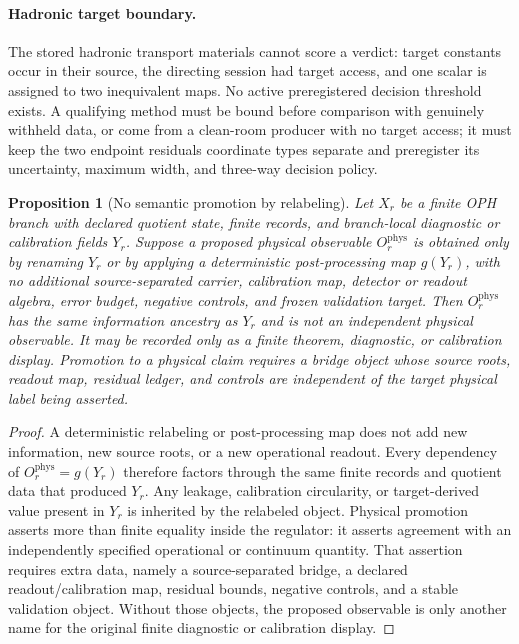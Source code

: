 \documentclass[11pt]{article}
\newtheorem{proposition}[theorem]{Proposition}
\begin{document}
\paragraph{Hadronic target boundary.}
The stored hadronic transport materials cannot score a verdict: target
constants occur in their source, the directing session had target access, and
one scalar is assigned to two inequivalent maps. No active preregistered
decision threshold exists. A qualifying method must be bound before comparison
with genuinely withheld data, or come from a clean-room producer with no target
access; it must keep the two endpoint residuals coordinate types separate and preregister its
uncertainty, maximum width, and three-way decision policy.

\begin{proposition}[No semantic promotion by relabeling]\label{prop:no-semantic-promotion}
Let \(X_r\) be a finite OPH branch with declared quotient state, finite records,
and branch-local diagnostic or calibration fields \(Y_r\). Suppose a proposed
physical observable \(O^{\mathrm{phys}}_r\) is obtained only by renaming \(Y_r\)
or by applying a deterministic post-processing map \(g(Y_r)\), with no
additional source-separated carrier, calibration map, detector or readout
algebra, error budget, negative controls, and frozen validation target. Then
\(O^{\mathrm{phys}}_r\) has the same information ancestry as \(Y_r\) and is not
an independent physical observable. It may be recorded only as a finite theorem,
diagnostic, or calibration display. Promotion to a physical claim requires a
bridge object whose source roots, readout map, residual ledger, and controls are
independent of the target physical label being asserted.
\end{proposition}

\begin{proof}
A deterministic relabeling or post-processing map does not add new information,
new source roots, or a new operational readout. Every dependency of
\(O^{\mathrm{phys}}_r=g(Y_r)\) therefore factors through the same finite records
and quotient data that produced \(Y_r\). Any leakage, calibration circularity, or
target-derived value present in \(Y_r\) is inherited by the relabeled object.
Physical promotion asserts more than finite equality inside the regulator: it
asserts agreement with an independently specified operational or continuum
quantity. That assertion requires extra data, namely a source-separated bridge,
a declared readout/calibration map, residual bounds, negative controls, and a
stable validation object. Without those objects, the proposed observable is only another
name for the original finite diagnostic or calibration display.
\end{proof}
\end{document}
